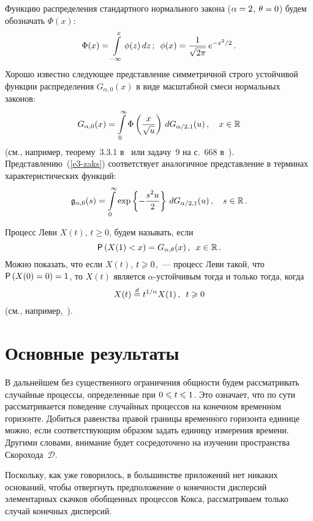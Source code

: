 \begin{multicols}{2}
Функцию распределения стандартного нормального закона ($\alpha\hm=2$,
$\theta\hm=0$) будем обозначать $\Phi(x)$:
$$
\Phi(x)=\int\limits_{-\infty}^x\phi(z)\,dz\,;\enskip
\phi(x)=\displaystyle\frac{\displaystyle 1\mathstrut}{\displaystyle \sqrt{2\pi}\mathstrut}\,e^{-x^2/2}\,.
$$
Хорошо известно следующее представление сим\-мет\-рич\-ной строго
устойчивой функции распределения $G_{\alpha,0}(x)$ в виде масштабной
смеси нормальных законов:
\begin{equation}
G_{\alpha,0}(x)=\int\limits_{0}^{\infty}\Phi\left(\displaystyle\frac{\displaystyle x\mathstrut}{\displaystyle \sqrt{u}\mathstrut}\right)\,dG_{\alpha/2,1}(u)\,,\
\ \ x\in\mathbb{R}\label{e3-zaks}
\end{equation}
(см., например, теорему~3.3.1 в~\cite{Zolotarev1983} или задачу~9 на
с.~668 в~\cite{Feller1984}). Представлению~(\ref{e3-zaks}) соответствует
аналогичное представление в терминах характеристических функций:
\begin{equation*}
\mathfrak{g}_{\alpha,0}(s)=\int\limits_{0}^{\infty}\exp
\left\{-\displaystyle\frac{\displaystyle s^2u\mathstrut}{\displaystyle 2\mathstrut}\right\}\,dG_{\alpha/2,1}(u)\,,\
\ \ s\in\mathbb{R}\,.
\end{equation*}

Процесс Леви $X(t)$, $t\geqslant0$, будем называть, если
$$
{\sf P}\left(X(1)<x\right)=G_{\alpha,\theta}(x)\,,\enskip x\in\mathbb{R}\,.
$$
Можно показать, что если $X(t)$, $t\hm\geqslant0$,~--- процесс Леви такой, что
${\sf P}\left(X(0)\hm=0\right)\hm=1$, то $X(t)$ является $\alpha$-устой\-чи\-вым
тогда и только тогда, когда
\begin{equation}
X(t)\stackrel{d}{=} t^{1/\alpha}X(1)\,,\enskip t\geqslant0
\label{e5-zaks}
\end{equation}
(см., например,~\cite{EmbrechtsMaejima2002}).

\section{Основные результаты}

В дальнейшем без существенного ограничения общности будем
рассматривать случайные процессы, определенные при $0\hm\leqslant t\hm\leqslant1$. Это
означает, что по сути рассматривается поведение случайных процессов
на конечном временн$\acute{\mbox{о}}$м горизонте. Добиться равенства правой
границы временн$\acute{\mbox{о}}$го горизонта единице можно, если соответствующим
образом задать единицу измерения времени. Другими словами, внимание
будет сосредоточено на изучении пространства Скорохода~$\mathcal{D}$.

Поскольку, как уже говорилось, в большинстве приложений нет никаких
оснований, чтобы отвергнуть предположение о конечности дисперсий
элементарных скачков обобщенных процессов Кокса, рассматриваем
только случай конечных дисперсий.


\end{multicols}

